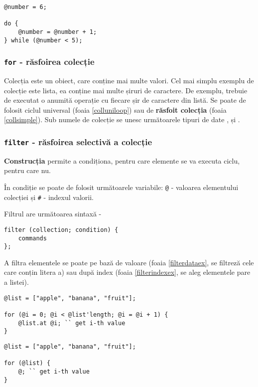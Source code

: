 \begin{lstlisting}[caption=Ciclu do while, label=dowhileex]
@number = 6;

do {
	@number = @number + 1;
} while (@number < 5);
\end{lstlisting}

\subsubsection{\lstinline`for` - răsfoirea colecție}

{Colecția} este un obiect, care conține mai multe valori. Cel mai simplu exemplu de colecție este lista, ea conține mai multe șiruri de caractere. De exemplu, trebuie de executat o anumită operație cu fiecare șir de caractere din listă. Se poate de folosit ciclul universal (foaia \ref{colluniloop}) sau de {\bf răsfoit colecția} (foaia \ref{collsimple}). Sub numele de colecție se unesc următoarele tipuri de date ,  și .

\subsubsection{\lstinline`filter` - răsfoirea selectivă a colecție}

{\bf Construcția } permite a condiționa, pentru care elemente se va executa ciclu, pentru care nu.

În condiție se poate de folosit următoarele variabile: \lstinline|@| - valoarea elementului colecției și \lstinline|#| - indexul valorii.

Filtrul are următoarea sintaxă -
\begin{lstlisting}[numbers=none]
filter (collection; condition) {
	commands
};
\end{lstlisting}

A filtra elementele se poate pe bază de valoare (foaia \ref{filterdataex}, se filtreză cele care conțin litera a) sau după index (foaia \ref{filterindexex}, se aleg elementele pare a listei).

\begin{lstlisting}[caption=Răsfoirea colecție prin ciclu universal, label=colluniloop]
@list = ["apple", "banana", "fruit"];

for (@i = 0; @i < @list'length; @i = @i + 1) {
	@list.at @i; `` get i-th value
}
\end{lstlisting}

\begin{lstlisting}[caption=Răsfoirea simplificată a colecției, label=collsimple]
@list = ["apple", "banana", "fruit"];

for (@list) {
	@; `` get i-th value
}
\end{lstlisting}

